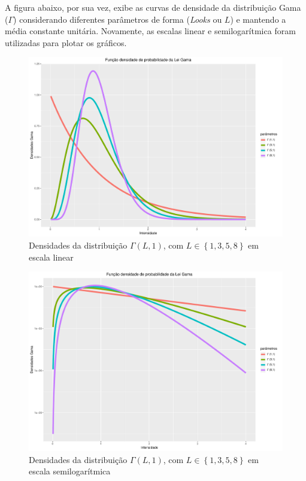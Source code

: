 A figura abaixo, por sua vez, exibe as curvas de densidade da distribuição Gama ($\Gamma$) considerando diferentes parâmetros de forma (\textit{Looks} ou $L$) e mantendo a média constante unitária. Novamente, as escalas linear e semilogarítmica foram utilizadas para plotar os gráficos.
\begin{figure}[H]
     \centering
     \includegraphics[scale=0.5]{plots/DensGamaLooksVar.pdf}
     \caption{Densidades da distribuição $\Gamma(L, 1)$, com $ L \in \left \{  1, 3, 5, 8 \right \}$ em escala linear}
     \label{graf_densGama}
\end{figure}
\begin{figure}[H]
     \centering
     \includegraphics[scale=0.5]{plots/DensGamaLooksVarSemiLog.pdf}
     \caption{Densidades da distribuição $\Gamma(L, 1)$, com $ L \in \left \{  1, 3, 5, 8 \right \}$ em escala semilogarítmica}
     \label{graf_densGama_Log}
\end{figure}

